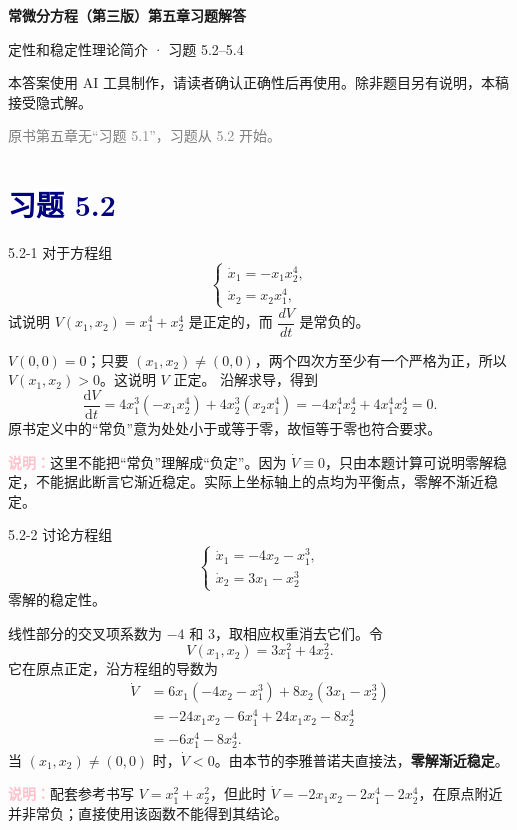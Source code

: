 \documentclass[UTF8,a4paper,11pt]{ctexart}
\newcommand{\note}[1]{\par\smallskip\noindent\textcolor{pink}{\bfseries 说明：}#1\par\smallskip}
\newcommand{\sect}[1]{\section*{\textcolor{navy}{习题 #1}}}
\begin{document}
\begin{center}
  {\LARGE\bfseries\color{navy}常微分方程（第三版）第五章习题解答\par}
  \vspace{0.35em}
  {\color{pink}定性和稳定性理论简介 · 习题 5.2--5.4\par}
\end{center}
\begin{center}
  \small\color{gray}本答案使用 AI 工具制作，请读者确认正确性后再使用。除非题目另有说明，本稿接受隐式解。
\end{center}
\noindent\textcolor{gray}{\small 原书第五章无“习题 5.1”，习题从 5.2 开始。}

\sect{5.2}

\begin{problem}{5.2-1}
对于方程组
\[
\begin{cases}
\dot{x}_1=-x_1x_2^4,\\
\dot{x}_2=x_2x_1^4,
\end{cases}
\]
试说明 $V(x_1,x_2)=x_1^4+x_2^4$ 是正定的，而 $\dfrac{dV}{dt}$ 是常负的。
\end{problem}
\begin{solution}
$V(0,0)=0$；只要 $(x_1,x_2)\ne(0,0)$，两个四次方至少有一个严格为正，所以 $V(x_1,x_2)>0$。这说明 $V$ 正定。
沿解求导，得到
\[
\frac{\mathrm dV}{\mathrm dt}
=4x_1^3(-x_1x_2^4)+4x_2^3(x_2x_1^4)
=-4x_1^4x_2^4+4x_1^4x_2^4=0.
\]
原书定义中的“常负”意为处处小于或等于零，故恒等于零也符合要求。
\note{这里不能把“常负”理解成“负定”。因为 $\dot V\equiv0$，只由本题计算可说明零解稳定，不能据此断言它渐近稳定。实际上坐标轴上的点均为平衡点，零解不渐近稳定。}
\end{solution}



\begin{problem}{5.2-2}
讨论方程组
\[
\begin{cases}
\dot{x}_1=-4x_2-x_1^3,\\
\dot{x}_2=3x_1-x_2^3
\end{cases}
\]
零解的稳定性。
\end{problem}
\begin{solution}
线性部分的交叉项系数为 $-4$ 和 $3$，取相应权重消去它们。令
\[
V(x_1,x_2)=3x_1^2+4x_2^2.
\]
它在原点正定，沿方程组的导数为
\[
\begin{aligned}
\dot V
&=6x_1(-4x_2-x_1^3)+8x_2(3x_1-x_2^3)\\
&=-24x_1x_2-6x_1^4+24x_1x_2-8x_2^4\\
&=-6x_1^4-8x_2^4.
\end{aligned}
\]
当 $(x_1,x_2)\ne(0,0)$ 时，$\dot V<0$。由本节的李雅普诺夫直接法，\textbf{零解渐近稳定}。
\note{配套参考书写 $V=x_1^2+x_2^2$，但此时 $\dot V=-2x_1x_2-2x_1^4-2x_2^4$，在原点附近并非常负；直接使用该函数不能得到其结论。}
\end{solution}
\end{document}
